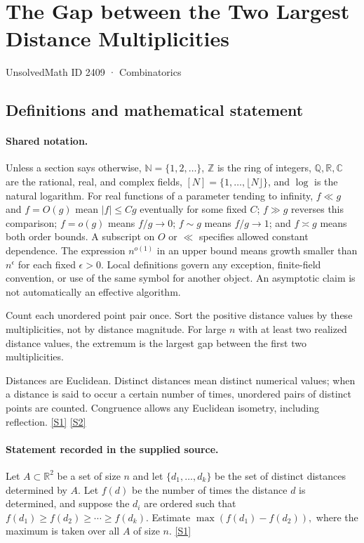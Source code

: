 \documentclass[11pt,a4paper]{article}
\newcommand{\N}{\mathbb{N}}
\newcommand{\Z}{\mathbb{Z}}
\newcommand{\Q}{\mathbb{Q}}
\newcommand{\R}{\mathbb{R}}
\newcommand{\C}{\mathbb{C}}
\newcommand{\sref}[2]{\hyperlink{source:#1:#2}{[S#2]}}
\begin{document}

\setcounter{section}{2408}

\section{The Gap between the Two Largest Distance Multiplicities}\label{2409}

{\small\sffamily UnsolvedMath ID 2409 · Combinatorics}

\subsection{Definitions and mathematical statement}

\paragraph{Shared notation.}Unless a section says otherwise, $\N=\{1,2,\ldots\}$,
$\Z$ is the ring of integers, $\Q,\R,\C$ are the rational, real, and complex
fields, $[N]=\{1,\ldots,\lfloor N\rfloor\}$, and $\log$ is the natural
logarithm. For real functions of a parameter tending to infinity,
$f\ll g$ and $f=O(g)$ mean $|f|\leq Cg$ eventually for some fixed $C$;
$f\gg g$ reverses this comparison; $f=o(g)$ means $f/g\to0$;
$f\sim g$ means $f/g\to1$; and $f\asymp g$ means both order bounds.
A subscript on $O$ or $\ll$ specifies allowed constant dependence.
The expression $n^{o(1)}$ in an upper bound means growth smaller than
$n^\epsilon$ for each fixed $\epsilon>0$. Local definitions govern any
exception, finite-field convention, or use of the same symbol for another
object. An asymptotic claim is not automatically an effective algorithm.



Count each unordered point pair once. Sort the positive distance values by these multiplicities, not by distance magnitude. For large $n$ with at least two realized distance values, the extremum is the largest gap between the first two multiplicities.

Distances are Euclidean. Distinct distances mean distinct numerical values; when a distance is said to occur a certain number of times, unordered pairs of distinct points are counted. Congruence allows any Euclidean isometry, including reflection. \sref{2409}{1} \sref{2409}{2}

\paragraph{Statement recorded in the supplied source.}
Let $A\subset \mathbb{R}^2$ be a set of size $n$ and let $\{d_1,\ldots,d_k\}$ be the set of distinct distances determined by $A$. Let $f(d)$ be the number of times the distance $d$ is determined, and suppose the $d_i$ are ordered such that $ f(d_1)\geq f(d_2)\geq \cdots \geq f(d_k). $ Estimate $ \max (f(d_1)-f(d_2)), $ where the maximum is taken over all $A$ of size $n$. \sref{2409}{1}
\end{document}
